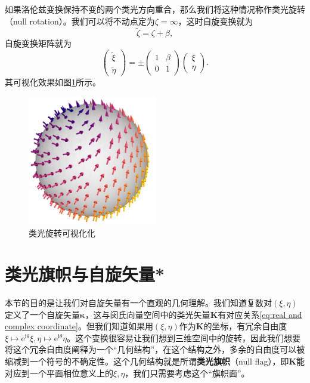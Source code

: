 如果洛伦兹变换保持不变的两个类光方向重合，那么我们将这种情况称作类光旋转（null rotation）。我们可以将不动点定为$\zeta =\infty $，这时自旋变换就为
\begin{equation*}
	\tilde{\zeta } =\zeta +\beta ,
\end{equation*}
自旋变换矩阵就为
\begin{equation*}
	\begin{pmatrix}
		\tilde{\xi }\\
		\tilde{\eta }
	\end{pmatrix} =\pm \begin{pmatrix}
		1 & \beta \\
		0 & 1
	\end{pmatrix}\begin{pmatrix}
		\xi \\
		\eta 
	\end{pmatrix} .
\end{equation*}
其可视化效果如图\ref{fig:visualization of null rotation}所示。

\begin{figure}[h]
	\centering
	\includegraphics[width=160.28pt,height=161.62pt]{null rotation.pdf}
	\caption{类光旋转可视化化}
	\label{fig:visualization of null rotation}
\end{figure}

\section{类光旗帜与自旋矢量*}

本节的目的是让我们对自旋矢量有一个直观的几何理解。我们知道复数对$( \xi ,\eta )$定义了一个自旋矢量$\boldsymbol{\kappa }$，这与闵氏向量空间中的类光矢量$\boldsymbol{K}$有对应关系\ref{eq:real and complex coordinate}。但我们知道如果用$( \xi ,\eta )$作为$\boldsymbol{K}$的坐标，有冗余自由度$\xi \mapsto \mathrm{e}^{\mathrm{i} \theta } \xi ,\eta \mapsto \mathrm{e}^{\mathrm{i} \theta } \eta $。这个变换很容易让我们想到三维空间中的旋转，因此我们想要将这个冗余自由度阐释为一个“几何结构”，在这个结构之外，多余的自由度可以被缩减到一个符号的不确定性。这个几何结构就是所谓\textbf{类光旗帜}（null flag），即$\boldsymbol{K}$能对应到一个平面相位意义上的$\xi ,\eta $，我们只需要考虑这个“旗帜面”。



